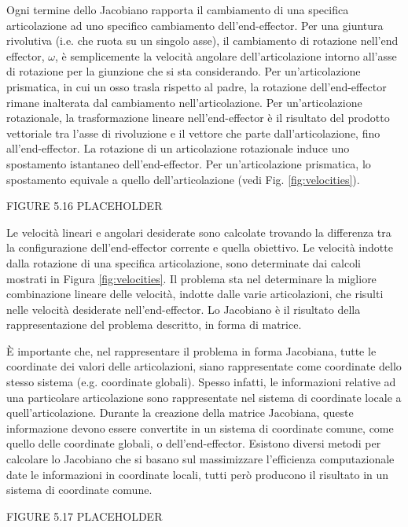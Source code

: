 Ogni termine dello Jacobiano rapporta il cambiamento di una specifica articolazione ad uno specifico cambiamento dell'end-effector.
Per una giuntura rivolutiva (i.e. che ruota su un singolo asse), il cambiamento di rotazione nell'end effector, $\omega$, è semplicemente la velocità angolare dell'articolazione intorno all'asse di rotazione per la giunzione che si sta considerando.
Per un'articolazione prismatica, in cui un osso trasla rispetto al padre, la rotazione dell'end-effector rimane inalterata dal cambiamento nell'articolazione.
Per un'articolazione rotazionale, la trasformazione lineare nell'end-effector è il risultato del prodotto vettoriale tra l'asse di rivoluzione e il vettore che parte dall'articolazione, fino all'end-effector.
La rotazione di un articolazione rotazionale induce uno spostamento istantaneo dell'end-effector.
Per un'articolazione prismatica, lo spostamento equivale a quello dell'articolazione (vedi Fig. \ref{fig:velocities}).

FIGURE 5.16 PLACEHOLDER\label{fig:velocities}

Le velocità lineari e angolari desiderate sono calcolate trovando la differenza tra la configurazione dell'end-effector corrente e quella obiettivo. Le velocità indotte dalla rotazione di una specifica articolazione, sono determinate dai calcoli mostrati in Figura \ref{fig:velocities}.
Il problema sta nel determinare la migliore combinazione lineare delle velocità, indotte dalle varie articolazioni, che risulti nelle velocità desiderate nell'end-effector.
Lo Jacobiano è il risultato della rappresentazione del problema descritto, in forma di matrice.

È importante che, nel rappresentare il problema in forma Jacobiana, tutte le coordinate dei valori delle articolazioni, siano rappresentate come coordinate dello stesso sistema (e.g. coordinate globali).
Spesso infatti, le informazioni relative ad una particolare articolazione sono rappresentate nel sistema di coordinate locale a quell'articolazione.
Durante la creazione della matrice Jacobiana, queste informazione devono essere convertite in un sistema di coordinate comune, come quello delle coordinate globali, o dell'end-effector.
Esistono diversi metodi per calcolare lo Jacobiano che si basano sul massimizzare l'efficienza computazionale date le informazioni in coordinate locali, tutti però producono il risultato in un sistema di coordinate comune.

FIGURE 5.17 PLACEHOLDER\label{fig:IKex0}

